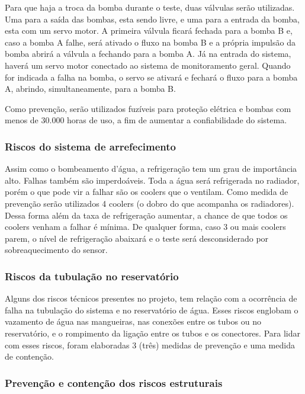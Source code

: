 Para que haja a troca da bomba durante o teste, duas válvulas serão utilizadas. Uma para a saída das bombas, esta sendo livre, e uma para a entrada da bomba, esta com um servo motor. A primeira válvula ficará fechada para a bomba B e, caso a bomba A falhe, será ativado o fluxo na bomba B e a própria impulsão da bomba abrirá a válvula a fechando para a bomba A. Já na entrada do sistema, haverá um servo motor conectado ao sistema de monitoramento geral. Quando for indicada a falha na bomba, o servo se ativará e fechará o fluxo para a bomba A, abrindo, simultaneamente, para a bomba B.

Como prevenção, serão utilizados fuzíveis para proteção elétrica e bombas com menos de 30.000 horas de uso, a fim de aumentar a confiabilidade do sistema.

\subsubsection{Riscos do sistema de arrefecimento}
Assim como o bombeamento d'água, a refrigeração tem um grau de importância alto. Falhas também são imperdoáveis. 
Toda a água será refrigerada no radiador, porém o que pode vir a falhar são os coolers que o ventilam.  Como medida de prevenção serão utilizados 4 coolers (o dobro do que acompanha os radiadores). Dessa forma além da taxa de refrigeração aumentar, a chance de que todos os coolers venham a falhar é mínima. 
De qualquer forma, caso 3 ou mais coolers parem, o nível de refrigeração abaixará e o teste será desconsiderado por sobreaquecimento do sensor.

\subsubsection{Riscos da tubulação no reservatório}

Alguns dos riscos técnicos presentes no projeto, tem relação com a ocorrência de falha na tubulação do sistema e no reservatório de água. Esses riscos englobam o vazamento de água nas mangueiras, nas conexões entre os tubos ou no reservatório, e o rompimento da ligação entre os tubos e os conectores.
Para lidar com esses riscos, foram elaboradas 3 (três) medidas de prevenção e uma medida de contenção.


\subsubsection{Prevenção e contenção dos riscos estruturais}

